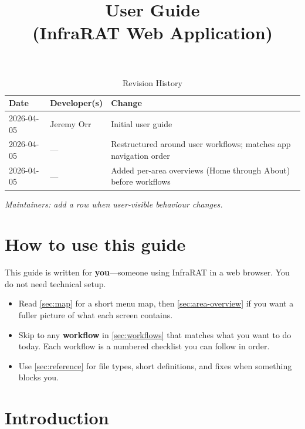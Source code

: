 \documentclass{article}
\title{User Guide\\\progname{} (InfraRAT Web Application)}
\author{\authname}
\date{}
\begin{document}
\begin{table}[hp]
\caption{Revision History} \label{TblRevisionHistory}
\begin{tabularx}{\textwidth}{llX}
\toprule
\textbf{Date} & \textbf{Developer(s)} & \textbf{Change}\\
\midrule
2026-04-05 & Jeremy Orr & Initial user guide\\
2026-04-05 & --- & Restructured around user workflows; matches app navigation order\\
2026-04-05 & --- & Added per-area overviews (Home through About) before workflows\\
\bottomrule
\end{tabularx}
\end{table}

\vspace{0.5em}
\noindent\textit{Maintainers: add a row when user-visible behaviour changes.}

\newpage

\maketitle

\tableofcontents
\newpage

\section{How to use this guide}
\label{sec:how-to-use}

This guide is written for \textbf{you}---someone using InfraRAT in a web browser. You do not need technical setup.

\begin{itemize}[nosep]
  \item Read \cref{sec:map} for a short menu map, then \cref{sec:area-overview} if you want a fuller picture of what each screen contains.
  \item Skip to any \textbf{workflow} in \cref{sec:workflows} that matches what you want to do today. Each workflow is a numbered checklist you can follow in order.
  \item Use \cref{sec:reference} for file types, short definitions, and fixes when something blocks you.
\end{itemize}

\section{Introduction}
\label{sec:introduction}
\end{document}
